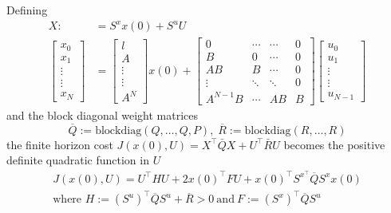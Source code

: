\newpar{}

Defining
\noindent\begin{align*}
    X:                        & =S^x x(0)+S^u U \\
    \left.\left[
    \begin{array}
            {c}x_0 \\
            x_1    \\
            \vdots \\
            \vdots \\
            x_N
        \end{array}\right.\right] & =
    \begin{bmatrix}
        l      \\
        A      \\
        \vdots \\
        \vdots \\
        A^N
    \end{bmatrix}x(0)+
    \begin{bmatrix}
        0        & \cdots & \cdots & 0 \\
        B        & 0      & \cdots & 0 \\
        AB       & B      & \cdots & 0 \\
        \vdots   & \ddots & \ddots & 0 \\
        A^{N-1}B & \cdots & AB     & B
    \end{bmatrix}
    \begin{bmatrix}
        u_0    \\
        u_1    \\
        \vdots \\
        \vdots \\
        u_{N-1}
    \end{bmatrix}
\end{align*}
and the block diagonal weight matrices
\noindent\begin{equation*}
    \overline{Q}:=\mathrm{blockdiag}(Q,\dots,Q,P),\; \overline{R}:=\mathrm{blockdiag}(R,\dots,R)
\end{equation*}
the finite horizon cost $J(x(0), U) = X^{\top}\bar{Q}X + U^{\top}\bar{R}U$ becomes the positive definite quadratic function in $U$
\noindent\begin{gather*}
    J(x(0), U) =U^{\top}HU+2{x(0)}^{\top}FU+{x(0)}^{\top}S^{x^{\top}}\overline{Q}S^{x}x(0)\\
    \text{where } H:={(S^u)}^\top\overline{Q} S^u+\overline{R} > 0 \mathrm{~and~}F:={(S^x)}^\top\overline{Q} S^u
\end{gather*}

